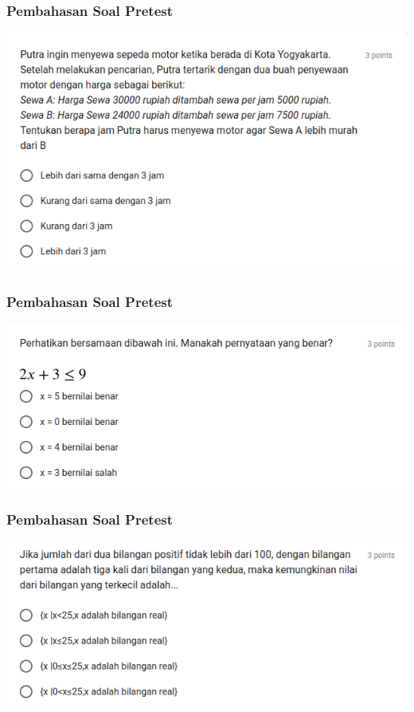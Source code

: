 \documentclass[pdflatex,compress,mathserif]{beamer}
\begin{document}
	\begin{frame}
		\frametitle{Pembahasan Soal Pretest}
		\begin{center}
			\includegraphics[width=\linewidth]{img/img22}
		\end{center}
	\end{frame}
	
	\begin{frame}
		\frametitle{Pembahasan Soal Pretest}
		\begin{center}
			\includegraphics[width=\linewidth]{img/img23}
		\end{center}
	\end{frame}
	
	\begin{frame}
		\frametitle{Pembahasan Soal Pretest}
		\begin{center}
			\includegraphics[width=\linewidth]{img/img24}
		\end{center}
	\end{frame}
	
\end{document}
